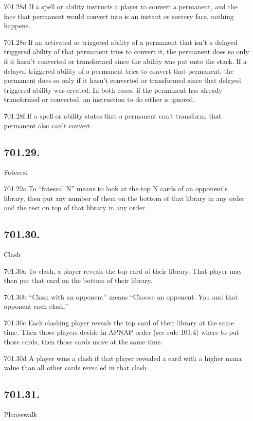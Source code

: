 701.28d If a spell or ability instructs a player to convert a permanent, and the face that permanent would convert into is an instant or sorcery face, nothing happens.

701.28e If an activated or triggered ability of a permanent that isn’t a delayed triggered ability of that permanent tries to convert it, the permanent does so only if it hasn’t converted or transformed since the ability was put onto the stack. If a delayed triggered ability of a permanent tries to convert that permanent, the permanent does so only if it hasn’t converted or transformed since that delayed triggered ability was created. In both cases, if the permanent has already transformed or converted, an instruction to do either is ignored.

701.28f If a spell or ability states that a permanent can’t transform, that permanent also can’t convert.

\subsection*{701.29.}
Fateseal

701.29a To “fateseal N” means to look at the top N cards of an opponent’s library, then put any number of them on the bottom of that library in any order and the rest on top of that library in any order.

\subsection*{701.30.}
Clash

701.30a To clash, a player reveals the top card of their library. That player may then put that card on the bottom of their library.

701.30b “Clash with an opponent” means “Choose an opponent. You and that opponent each clash.”

701.30c Each clashing player reveals the top card of their library at the same time. Then those players decide in APNAP order (see rule 101.4) where to put those cards, then those cards move at the same time.

701.30d A player wins a clash if that player revealed a card with a higher mana value than all other cards revealed in that clash.

\subsection*{701.31.}
Planeswalk

